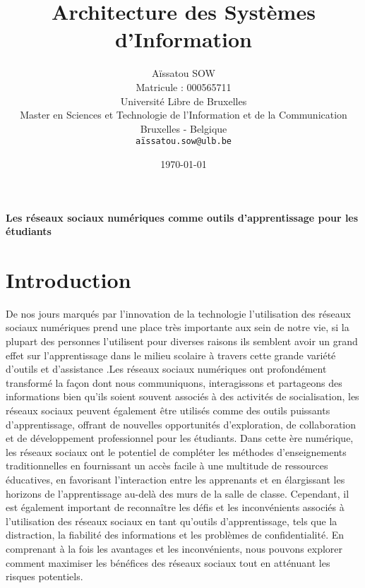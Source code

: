 \documentclass[12pt,a4paper,titlepage]{article}
\title{Architecture des Systèmes d'Information {}}
\author{Aïssatou SOW\\
   Matricule : 000565711\\
   Université Libre de Bruxelles\\
   Master en Sciences et Technologie de l'Information et de la Communication\\
   Bruxelles - Belgique\\
   \texttt{aïssatou.sow@ulb.be}}
\date{\today}
\begin{document}
\maketitle

\clearpage
\vspace*{\fill}
\begin{center}
\begin{minipage}{.6\textwidth}
\begin{center}
\huge {\textbf {Les réseaux sociaux numériques comme outils d'apprentissage pour les étudiants  }} 
\end{center}
\end{minipage}
\end{center}
\vfill %
\clearpage

\tableofcontents


\newpage

\section{Introduction}
De nos jours marqués par l’innovation de la technologie l’utilisation des réseaux sociaux numériques prend une place très importante aux sein de notre vie, si la plupart des personnes l’utilisent pour diverses raisons ils semblent avoir un grand effet sur l’apprentissage dans le milieu scolaire à travers cette grande variété d’outils et d’assistance .Les réseaux sociaux numériques ont profondément transformé la façon dont nous communiquons, interagissons et partageons des informations bien qu'ils soient souvent associés à des activités de socialisation, les réseaux sociaux peuvent également être utilisés comme des outils puissants d'apprentissage, offrant de nouvelles opportunités d'exploration, de collaboration et de développement professionnel pour les étudiants. Dans cette ère numérique, les réseaux sociaux ont le potentiel de compléter les méthodes d'enseignements traditionnelles en fournissant un accès facile à une multitude de ressources éducatives, en favorisant l'interaction entre les apprenants et en élargissant les horizons de l'apprentissage au-delà des murs de la salle de classe. Cependant,  il est également important de reconnaître les défis et les inconvénients associés à l'utilisation des réseaux sociaux en tant qu'outils d'apprentissage, tels que la distraction, la fiabilité des informations et les problèmes de confidentialité. En comprenant à la fois les avantages et les inconvénients, nous pouvons explorer comment maximiser les bénéfices des réseaux sociaux tout en atténuant les risques potentiels.\newline
\end{document}
